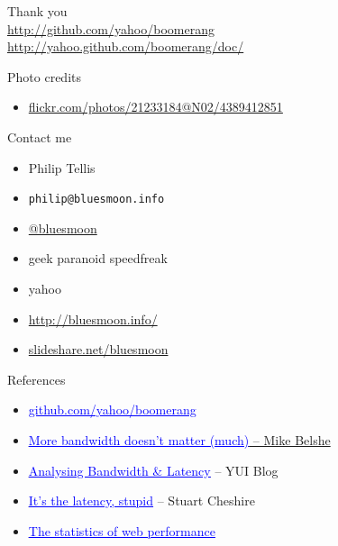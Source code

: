 \documentclass{beamer}
\begin{document}
\begin{frame}{}
  \begin{center}
  Thank you \\
  \tiny{
  \href{http://www.github.com/yahoo/boomerang/}{http://github.com/yahoo/boomerang} \\
  \href{http://yahoo.github.com/boomerang/doc/}{http://yahoo.github.com/boomerang/doc/}
  }
  \end{center}
\end{frame}

\begin{frame}{Photo credits}
  \begin{itemize}
  \item \href{http://www.flickr.com/photos/21233184@N02/4389412851/}{flickr.com/photos/21233184@N02/4389412851}
  \end{itemize}
\end{frame}

\begin{frame}{Contact me}
  \begin{itemize}
  \item Philip Tellis
  \item \small{\texttt{philip@bluesmoon.info}}
  \item \href{http://twitter.com/bluesmoon}{@bluesmoon}
  \item geek \bullet paranoid \bullet speedfreak
  \item yahoo
  \item \href{http://bluesmoon.info/}{http://bluesmoon.info/}
  \item \href{http://www.slideshare.net/bluesmoon}{slideshare.net/bluesmoon}
  \end{itemize}
\end{frame}

\begin{frame}{References}
  \begin{itemize}
  \item \href{http://github.com/yahoo/boomerang/}{\textcolor{blue}{\underline{github.com/yahoo/boomerang}}}
  \item \href{http://www.belshe.com/2010/05/24/more-bandwidth-doesnt-matter-much/}{\textcolor{blue}{\underline{More bandwidth doesn't matter (much)}} -- Mike Belshe}
  \item \href{http://www.yuiblog.com/blog/2010/04/08/analyzing-bandwidth-and-latency/}{\textcolor{blue}{\underline{Analysing Bandwidth \& Latency}}} -- YUI Blog
  \item \href{http://www.stuartcheshire.org/rants/Latency.html}{\textcolor{blue}{\underline{It's the latency, stupid}}} -- Stuart Cheshire
  \item \href{http://www.slideshare.net/bluesmoon/index-3441823}{\textcolor{blue}{\underline{The statistics of web performance}}}
  \end{itemize}
\end{frame}
\end{document}
